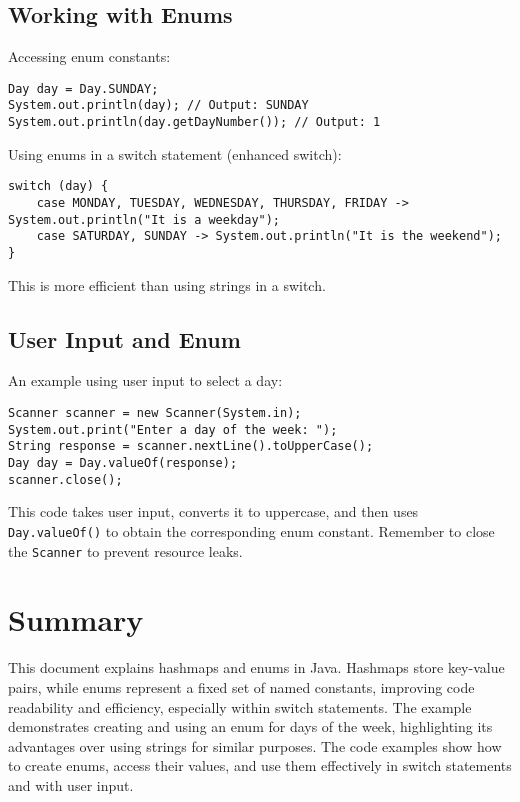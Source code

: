 \documentclass{article}
\begin{document}
\begin{itemize}
\subsection{Working with Enums}

Accessing enum constants:

\begin{verbatim}
Day day = Day.SUNDAY;
System.out.println(day); // Output: SUNDAY
System.out.println(day.getDayNumber()); // Output: 1
\end{verbatim}

Using enums in a switch statement (enhanced switch):

\begin{verbatim}
switch (day) {
    case MONDAY, TUESDAY, WEDNESDAY, THURSDAY, FRIDAY -> System.out.println("It is a weekday");
    case SATURDAY, SUNDAY -> System.out.println("It is the weekend");
}
\end{verbatim}

This is more efficient than using strings in a switch.


\subsection{User Input and Enum}

An example using user input to select a day:

\begin{verbatim}
Scanner scanner = new Scanner(System.in);
System.out.print("Enter a day of the week: ");
String response = scanner.nextLine().toUpperCase();
Day day = Day.valueOf(response);
scanner.close();
\end{verbatim}

This code takes user input, converts it to uppercase, and then uses \texttt{Day.valueOf()} to obtain the corresponding enum constant.  Remember to close the \texttt{Scanner} to prevent resource leaks.


\section{Summary}

This document explains hashmaps and enums in Java.  Hashmaps store key-value pairs, while enums represent a fixed set of named constants, improving code readability and efficiency, especially within switch statements. The example demonstrates creating and using an enum for days of the week, highlighting its advantages over using strings for similar purposes.  The code examples show how to create enums, access their values, and use them effectively in switch statements and with user input.



\end{itemize}
\end{document}
